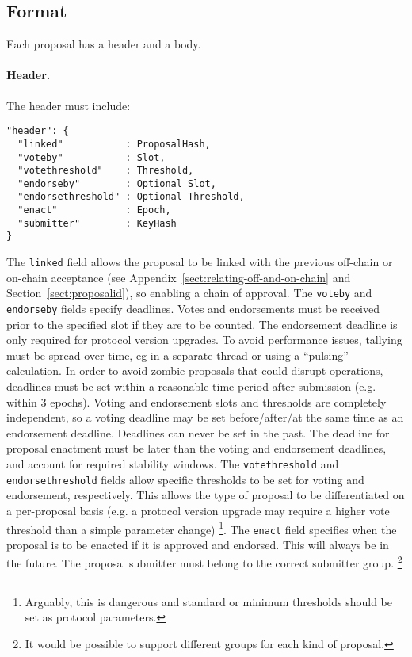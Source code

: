 \subsection{Format}

Each proposal has a header and a body.  %

\paragraph{Header.} The header must include:

\begin{verbatim}
"header": {
  "linked"           : ProposalHash,
  "voteby"           : Slot,
  "votethreshold"    : Threshold,
  "endorseby"        : Optional Slot,
  "endorsethreshold" : Optional Threshold,
  "enact"            : Epoch,
  "submitter"        : KeyHash
}
\end{verbatim}%

The \texttt{linked} field allows the proposal to be linked with the previous off-chain or on-chain acceptance (see Appendix~\ref{sect:relating-off-and-on-chain} and Section~\ref{sect:proposalid}), so enabling a chain of approval.  The \texttt{voteby} and \texttt{endorseby} fields specify deadlines.
Votes and endorsements must be received prior to the specified slot if they are to be counted.  The endorsement deadline is only required for protocol version upgrades.
To avoid performance issues, tallying must be spread over time, eg in a separate thread or using a ``pulsing'' calculation. %
In order to avoid zombie proposals that could disrupt operations, deadlines must be set within a reasonable time period after submission (e.g. within 3 epochs).
Voting and endorsement slots and thresholds are completely independent, so a voting deadline may be set before/after/at the same time as an endorsement deadline.
Deadlines can never be set in the past.
The deadline for proposal enactment must be later than the  voting and endorsement deadlines, and account for required stability windows.
%
The \texttt{votethreshold} and \texttt{endorsethreshold} fields allow specific thresholds to be set for voting and endorsement, respectively.  This allows the type of proposal to be differentiated on a per-proposal basis
(e.g. a protocol version upgrade may require a higher vote threshold than a simple parameter change)
\footnote{Arguably, this is dangerous and standard or minimum thresholds should be set as protocol parameters.}.
%
The \texttt{enact} field specifies when the proposal is to be enacted if it is approved and endorsed.  This will always be in the future.
%
The proposal submitter must belong to the correct submitter group.  \footnote{It would be possible to support
  different groups for each kind of proposal.}

